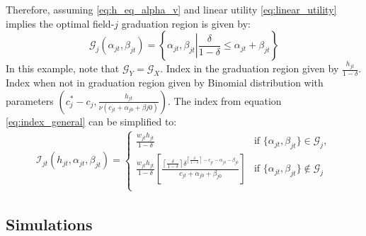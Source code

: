 \documentclass[11 pt]{article}
\newcommand{\toedit}[1]{{\color{gray}#1}}
\newcommand{\toedit}[1]{#1}
\newcommand{\sbr}[1]{\left[ #1 \right]}
\begin{document}
{Therefore, assuming \eqref{eq:h_eq_alpha_v} and linear utility \eqref{eq:linear_utility} implies the optimal field-$j$ graduation region is given by:
\begin{equation*}
    \mathcal{G}_j (\alpha_{jt}, \beta_{jt}) = \left\{ 
        \alpha_{jt}, \beta_{jt} 
        \left\vert \frac{\delta}{1 - \delta} \leq \alpha_{jt} + \beta_{jt}
    \right.\right\}
\end{equation*}
In this example, note that $\mathcal{G}_Y = \mathcal{G}_X$. Index in the graduation region given by $\frac{h_{jt}}{1 - \delta}$. 
Index when not in graduation region given by Binomial distribution with parameters $\left(c_j^* - c_j, \frac{h_{jt}}{\nu(c_{jt} + \alpha_{j0} + \beta{j0})}\right)$.
The index from equation \eqref{eq:index_general} can be simplified to:
\begin{align*}
\mathcal{I}_{jt} (h_{jt}, \alpha_{jt}, \beta_{jt}) = 
\begin{cases}
\frac{w_{jt} h_{jt}}{1 - \delta} & \text{if } \{\alpha_{jt}, \beta_{jt}\} \in \mathcal{G}_{j}, \\
\frac{w_{jt} h_{jt}}{1 - \delta} \sbr{
   \frac{
      \left\lceil \frac{\delta}{1 - \delta} \right\rceil
      \delta^{\left\lceil \frac{\delta}{1 - \delta} \right\rceil - c_{jt} - \alpha_{j0} - \beta_{j0}}}
   {c_{jt} + \alpha_{j0} + \beta_{j0}}
   } & \text{if } \{\alpha_{jt}, \beta_{jt}\} \notin \mathcal{G}_{j} \\
\end{cases}
\end{align*}

} %


\subsection{Simulations}\label{sec:sims_plots}
\end{document}
